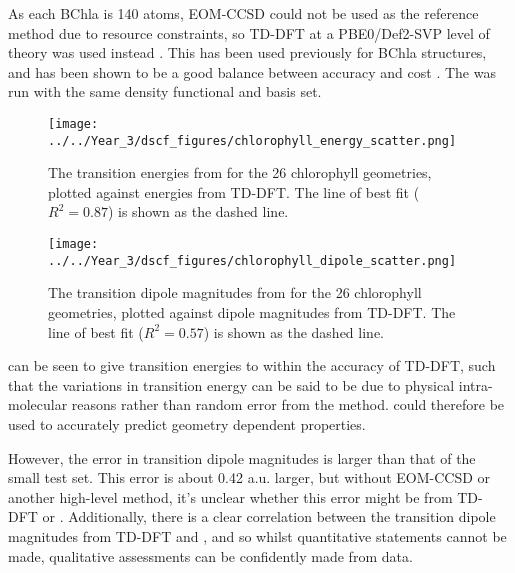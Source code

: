 As each BChla is 140 atoms, EOM-CCSD could not be used as the reference method due
to resource constraints, so TD-DFT at a PBE0/Def2-SVP level of theory was used instead \cite{Adamo1999, Schafer1992}.
This has been used previously for BChla structures, and has been shown to be a good
balance between accuracy and cost \cite{Stross2016}. 
The \dscf was run with the same density functional and basis set.

\begin{figure}
\centering
\texttt{[image: ../../Year\_3/dscf\_figures/chlorophyll\_energy\_scatter.png]}
\label{fig:chl_energy}
\caption{The transition energies from \dscf for the 26 chlorophyll geometries, 
plotted against energies from TD-DFT. The line of best fit ($R^2=0.87$) is shown 
as the dashed line.}
\end{figure}

\begin{figure}
\centering
\texttt{[image: ../../Year\_3/dscf\_figures/chlorophyll\_dipole\_scatter.png]}
\caption{The transition dipole magnitudes from \dscf for the 26 chlorophyll geometries, 
plotted against dipole magnitudes from TD-DFT. The line of best fit ($R^2= 0.57$) 
is shown as the dashed line.}
\label{fig:chl_dipole}
\end{figure}

\dscf can be seen to give transition energies to within the accuracy of TD-DFT, 
such that the variations in transition energy can be said to be due to
physical intra-molecular reasons rather than random error from the \dscf method.
\dscf could therefore be used to accurately predict geometry dependent properties.

However, the error in transition dipole magnitudes is larger than that of the small
test set. This error is about 0.42 a.u. larger, but without EOM-CCSD or another
high-level method, it's unclear whether this error might be from TD-DFT or \dscf.
Additionally, there is a clear correlation between the transition dipole magnitudes
from TD-DFT and \dscf, and so whilst quantitative statements cannot be made, qualitative
assessments can be confidently made from \dscf data.

\afterpartskip
